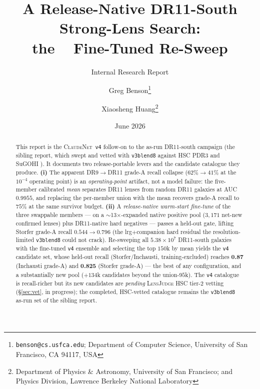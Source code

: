 \documentclass[11pt,letterpaper]{article}
\title{A Release-Native DR11-South Strong-Lens Search:\\
       the \cnet{}~\vc{} Fine-Tuned Re-Sweep}
\author{Greg Benson\thanks{\texttt{benson@cs.usfca.edu}; Department of Computer
        Science, University of San Francisco, CA 94117, USA} \and
        Xiaosheng Huang\thanks{Department of Physics \& Astronomy, University of
        San Francisco; and Physics Division, Lawrence Berkeley National Laboratory}}
\date{June 2026}
\newcommand{\cnet}{\textsc{ClaudeNet}}
\newcommand{\lj}{\textsc{LensJudge}}
\newcommand{\vb}{\texttt{v3blend8}}
\newcommand{\vc}{\texttt{v4}}
\begin{document}
\maketitle
\subtitle{Internal Research Report}

\begin{abstract}
This report is the \cnet{}~\vc{} follow-on to the as-run DR11-south campaign (the sibling report, which
swept and vetted with \vb{} against HSC PDR3 \citep{aihara2022hscpdr3} and SuGOHI
\citep{sonnenfeld2018sugohi}). It documents two release-portable levers and the candidate catalogue they
produce. \textbf{(i)} The apparent DR9$\to$DR11 grade-A recall collapse ($62\%\!\to\!41\%$ at the
$10^{-4}$ operating point) is an \emph{operating-point} artifact, not a model failure: the five-member
calibrated \emph{mean} separates DR11 lenses from random DR11 galaxies at AUC $0.9955$, and replacing the
per-member union with the mean recovers grade-A recall to $75\%$ at the same survivor budget.
\textbf{(ii)} A \emph{release-native warm-start fine-tune} of the three swappable members --- on a
$\sim$13$\times$-expanded native positive pool ($3{,}171$ net-new confirmed lenses) plus DR11-native hard
negatives --- passes a held-out gate, lifting Storfer grade-A recall $0.544\!\to\!0.796$ (the
lrg$+$companion hard residual the resolution-limited \vb{} could not crack). Re-sweeping all
$5.38\times10^{7}$ DR11-south galaxies with the fine-tuned \vc{} ensemble and selecting the top $150$k by
mean yields the \vc{} candidate set, whose held-out recall (Storfer/Inchausti, training-excluded) reaches
\textbf{0.87} (Inchausti grade-A) and \textbf{0.825} (Storfer grade-A) --- the best of any configuration,
and a substantially new pool ($+134$k candidates beyond the union-$95$k). The \vc{} catalogue is
recall-richer but its new candidates are \emph{pending} \lj{} HSC tier-2 vetting (\S\ref{sec:vet}, in
progress); the completed, HSC-vetted catalogue remains the \vb{} as-run set of the sibling report.
\end{abstract}
\end{document}
